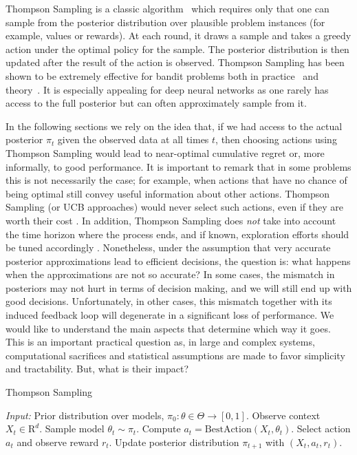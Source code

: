 \documentclass{article} \usepackage{iclr2018_conference,times}
\begin{document}
Thompson Sampling is a classic algorithm~\citep{thompson1933likelihood} which requires only that one can sample from the posterior distribution over plausible problem instances (for example, values or rewards).  At each round, it draws a sample and takes a greedy action under the optimal policy for the sample.  The posterior distribution is then updated after the result of the action is observed.  Thompson Sampling has been shown to be extremely effective for bandit problems both in practice~\citep{chappelle2011, granmo2010} and theory~\citep{agrawal2012}.  It is especially appealing for deep neural networks as one rarely has access to the full posterior but can often approximately sample from it. 

In the following sections we rely on the idea that, if we had access to the actual posterior $\pi_t$ given the observed data at all times $t$, then choosing actions using Thompson Sampling would lead to near-optimal cumulative regret or, more informally, to good performance.
It is important to remark that in some problems this is not necessarily the case; for example, when actions that have no chance of being optimal still convey useful information about other actions.
Thompson Sampling (or UCB approaches) would never select such actions, even if they are worth their cost \citep{russo2014learning}.
In addition, Thompson Sampling does \emph{not} take into account the time horizon where the process ends, and if known, exploration efforts should be tuned accordingly \citep{russo2017time}.
Nonetheless, under the assumption that very accurate posterior approximations lead to efficient decisions, the question is: what happens when the approximations are not so accurate?
In some cases, the mismatch in posteriors may not hurt in terms of decision making, and we will still end up with good decisions.
Unfortunately, in other cases, this mismatch together with its induced feedback loop will degenerate in a significant loss of performance.
We would like to understand the main aspects that determine which way it goes.
This is an important practical question as, in large and complex systems, computational sacrifices and statistical assumptions are made to favor simplicity and tractability. But, what is their impact?
\begin{algorithm}[t]
\caption{Thompson Sampling}\label{algo:ts}
\begin{algorithmic}[1]
\State \emph{Input:} Prior distribution over models, $\pi_0 : \theta \in \Theta \to [0, 1]$.
\State Observe context $X_t \in \mathrm{R}^d$.
\State Sample model $\theta_t \sim \pi_t$.
\State Compute $a_t = \text{BestAction}(X_t, \theta_t)$.
\State Select action $a_t$ and observe reward $r_t$.
\State Update posterior distribution $\pi_{t+1}$ with $(X_t, a_t, r_t)$.
\EndFor
\end{algorithmic}
\end{algorithm}
\end{document}
